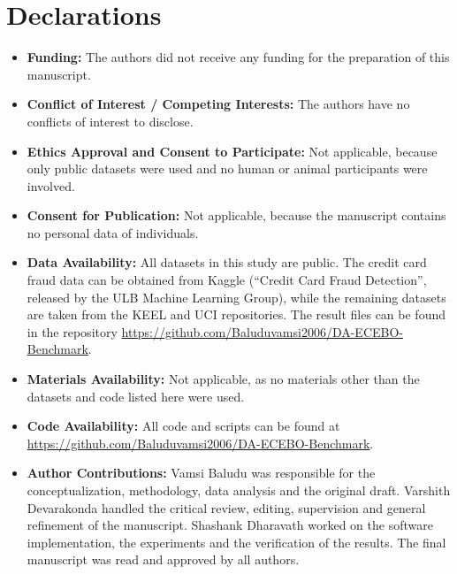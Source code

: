 \documentclass[preprint,10pt]{elsarticle}
\begin{document}
\section*{Declarations}
\begin{itemize}[leftmargin=1.2em,itemsep=4pt]
\item \textbf{Funding:} The authors did not receive any funding for the preparation of this manuscript.
\item \textbf{Conflict of Interest / Competing Interests:} The authors have no conflicts of interest to disclose.
\item \textbf{Ethics Approval and Consent to Participate:} Not applicable, because only public datasets were used and no human or animal participants were involved.
\item \textbf{Consent for Publication:} Not applicable, because the manuscript contains no personal data of individuals.
\item \textbf{Data Availability:} All datasets in this study are public. The credit card fraud data can be obtained from Kaggle (``Credit Card Fraud Detection'', released by the ULB Machine Learning Group), while the remaining datasets are taken from the KEEL and UCI repositories. The result files can be found in the repository \url{https://github.com/Baluduvamsi2006/DA-ECEBO-Benchmark}.
\item \textbf{Materials Availability:} Not applicable, as no materials other than the datasets and code listed here were used.
\item \textbf{Code Availability:} All code and scripts can be found at \url{https://github.com/Baluduvamsi2006/DA-ECEBO-Benchmark}.
\item \textbf{Author Contributions:} Vamsi Baludu was responsible for the conceptualization, methodology, data analysis and the original draft. Varshith Devarakonda handled the critical review, editing, supervision and general refinement of the manuscript. Shashank Dharavath worked on the software implementation, the experiments and the verification of the results. The final manuscript was read and approved by all authors.
\end{itemize}
\end{document}
